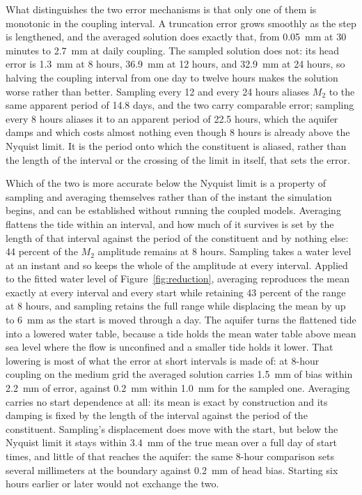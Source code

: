 \documentclass[preprint,authoryear,11pt]{elsarticle}
\begin{document}
What distinguishes the two error mechanisms is that only one of them is monotonic in the coupling interval. A truncation error grows smoothly as the step is lengthened, and the averaged solution does exactly that, from \SI{0.05}{\milli\meter} at 30 minutes to \SI{2.7}{\milli\meter} at daily coupling. The sampled solution does not: its head error is \SI{1.3}{\milli\meter} at 8 hours, \SI{36.9}{\milli\meter} at 12 hours, and \SI{32.9}{\milli\meter} at 24 hours, so halving the coupling interval from one day to twelve hours makes the solution worse rather than better. Sampling every 12 and every 24 hours aliases $M_2$ to the same apparent period of 14.8 days, and the two carry comparable error; sampling every 8 hours aliases it to an apparent period of 22.5 hours, which the aquifer damps and which costs almost nothing even though 8 hours is already above the Nyquist limit. It is the period onto which the constituent is aliased, rather than the length of the interval or the crossing of the limit in itself, that sets the error.

Which of the two is more accurate below the Nyquist limit is a property of sampling and averaging themselves rather than of the instant the simulation begins, and can be established without running the coupled models. Averaging flattens the tide within an interval, and how much of it survives is set by the length of that interval against the period of the constituent and by nothing else: 44 percent of the $M_2$ amplitude remains at 8 hours. Sampling takes a water level at an instant and so keeps the whole of the amplitude at every interval. Applied to the fitted water level of Figure~\ref{fig:reduction}, averaging reproduces the mean exactly at every interval and every start while retaining 43 percent of the range at 8 hours, and sampling retains the full range while displacing the mean by up to \SI{6}{\milli\meter} as the start is moved through a day. The aquifer turns the flattened tide into a lowered water table, because a tide holds the mean water table above mean sea level where the flow is unconfined \citep{philip1973periodic, nielsen1990tidal} and a smaller tide holds it lower. That lowering is most of what the error at short intervals is made of: at 8-hour coupling on the medium grid the averaged solution carries \SI{1.5}{\milli\meter} of bias within \SI{2.2}{\milli\meter} of error, against \SI{0.2}{\milli\meter} within \SI{1.0}{\milli\meter} for the sampled one. Averaging carries no start dependence at all: its mean is exact by construction and its damping is fixed by the length of the interval against the period of the constituent. Sampling's displacement does move with the start, but below the Nyquist limit it stays within \SI{3.4}{\milli\meter} of the true mean over a full day of start times, and little of that reaches the aquifer: the same 8-hour comparison sets several millimeters at the boundary against \SI{0.2}{\milli\meter} of head bias. Starting six hours earlier or later would not exchange the two.
\end{document}
